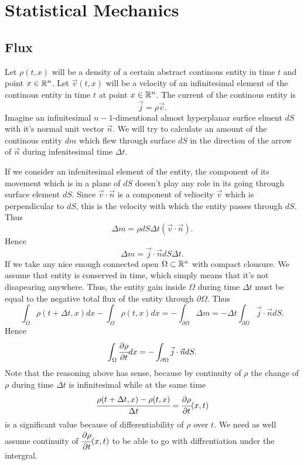 \documentclass[main.tex]{subfiles}
\begin{document}
\section{Statistical Mechanics}
\subsection{Flux}
Let $\rho(t,x)$ will be a density of a certain abstract continous entity in time $t$ and point $x\in\mathbb{R}^n$. Let $\vec{v}(t,x)$ will be a velocity of an infinitesimal element of the continous entity in time $t$ at point $x\in\mathbb{R}^n$.
The current of the continous entity is
\begin{equation}
\vec{j} = \rho \vec{v}.
\end{equation}
Imagine an infinitesimal $n-1$-dimentional almost hyperplanar surfice elment $dS$ with it's normal unit vector $\vec{n}$. We will try to calculate an amount of the continous entity $dm$ which flew through surface $dS$ in the direction of the arrow of $\vec{n}$ during infenitesimal time $\Delta t$.
 
If we consider an infenitesimal element of the entity, the component of its movement which is in a plane of $dS$ doesn't play any role in its going through surface element $dS$. Since $\vec{v}\cdot \vec{n}$ is a component of veliocity $\vec{v}$ which is perpendicular to $dS$, this is the velocity with which the entity passes through $dS$. Thus
\begin{equation}
\Delta m = \rho dS\Delta t(\vec{v}\cdot\vec{n}).
\end{equation}
Hence 
\begin{equation}
\Delta m = \vec{j}\cdot\vec{n} dS\Delta t.
\end{equation}
If we take any nice enough connected open $\Omega\subset \mathbb{R}^n$ with compact clousure.
We assume that entity is conserved in time, which simply means that it's not disapearing anywhere. Thus, the entity gain inside $\Omega$ during time $\Delta t$ must be equal to the negative total flux of the entity through $\partial \Omega$. Thus
\begin{equation}
\int_\Omega \rho(t + \Delta t, x)dx - \int_\Omega \rho(t, x)dx = 
-\int_{\partial \Omega} \Delta m = -\Delta t \int_{\partial \Omega} \vec{j}\cdot\vec{n} dS.
\end{equation}
Hence
\begin{equation}
\int_\Omega \cfrac{\partial \rho}{\partial t} dx = -\int_{\partial \Omega} \vec{j}\cdot\vec{n} dS.
\end{equation}
Note that the reasoning above has sense, because by continuity of $\rho$ the change of $\rho$ during time $\Delta t$ is infinitesimal while at the same time $$\cfrac{\rho(t + \Delta t, x) - \rho(t, x)}{\Delta t} = \cfrac{\partial \rho}{\partial t}(x,t)$$ is a significant value because of differentiability of $\rho$ over $t$. We need as well assume continuity of $\cfrac{\partial \rho}{\partial t}(x,t)$ to be able to go with diffrentiation under the intergral.
\end{document}
